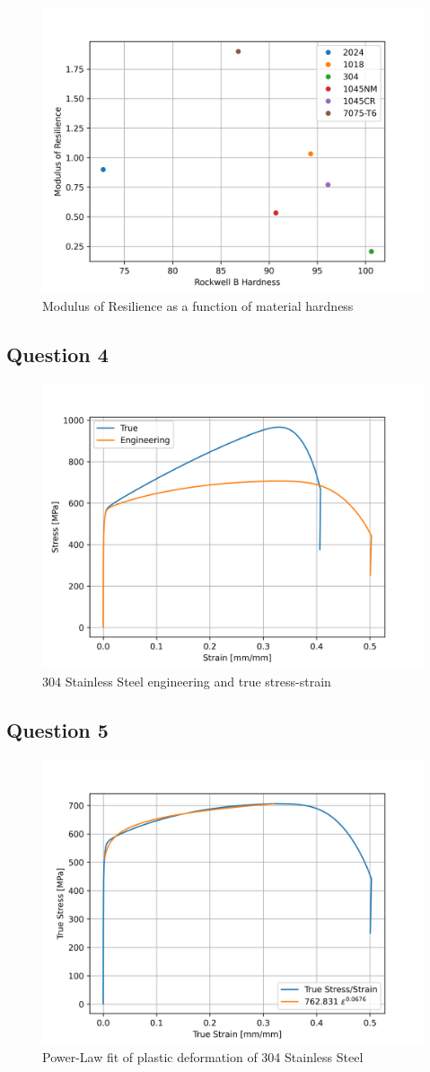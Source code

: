 \documentclass{article}
\begin{document}
\begin{figure}[!h!]
\begin{minipage}[b]{0.5\linewidth}
  \end{minipage} 
  \begin{minipage}[b]{\linewidth}
      \centering
      \includegraphics[width = .5\linewidth]{plots/q3_resilmod.png}
      \caption{Modulus of Resilience as a function of material hardness}
  \end{minipage}
\end{figure}
\newpage

\subsection{Question 4}
\begin{figure}[!h]
    \centering
    \includegraphics[width=0.5\linewidth]{plots/q4_evt.png}
    \caption{304 Stainless Steel engineering and true stress-strain}
    \label{fig:q4evt}
\end{figure}

\subsection{Question 5}
\begin{figure}[!h]
    \centering
    \includegraphics[width=0.5\linewidth]{plots/q5_fit.png}
    \caption{Power-Law fit of plastic deformation of 304 Stainless Steel}
    \label{fig:q5fit}
\end{figure}
\end{document}
